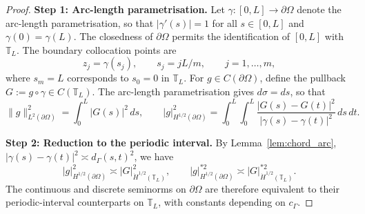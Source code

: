 \documentclass[11pt]{article}
\begin{document}
\begin{proof}
\textbf{Step 1: Arc-length parametrisation.}
Let $\gamma\colon[0,L] \to \partial\Omega$ denote the arc-length
parametrisation, so that $|\gamma'(s)| = 1$ for all $s \in [0,L]$
and $\gamma(0) = \gamma(L)$. The closedness of $\partial\Omega$
permits the identification of $[0,L]$ with $\mathbb{T}_L$. The
boundary collocation points are
\begin{equation*}
  z_j = \gamma(s_j),\qquad s_j = jL/m,\qquad j = 1,\ldots,m,
\end{equation*}
where $s_m = L$ corresponds to $s_0 = 0$ in $\mathbb{T}_L$. For
$g \in C(\partial\Omega)$, define the pullback
$G := g \circ \gamma \in C(\mathbb{T}_L)$. The arc-length
parametrisation gives $d\sigma = ds$, so that
\begin{equation*}
  \|g\|^2_{L^2(\partial\Omega)} = \int_0^L |G(s)|^2\,ds,
  \qquad
  |g|^2_{H^{1/2}(\partial\Omega)}
  = \int_0^L\!\int_0^L
    \frac{|G(s)-G(t)|^2}{|\gamma(s)-\gamma(t)|^2}\,ds\,dt.
\end{equation*}

\medskip\noindent
\textbf{Step 2: Reduction to the periodic interval.}
By Lemma~\ref{lem:chord_arc},
$|\gamma(s) - \gamma(t)|^2 \asymp d_\Gamma(s,t)^2$, we have
\begin{equation}\label{eq:transfer}
  |g|^2_{H^{1/2}(\partial\Omega)}
    \asymp |G|^2_{\dot{H}^{1/2}(\mathbb{T}_L)},
  \qquad
  |g|^{*2}_{H^{1/2}(\partial\Omega)}
    \asymp |G|^{*2}_{\dot{H}^{1/2}(\mathbb{T}_L)}.
\end{equation}
The continuous and discrete seminorms on $\partial\Omega$ are
therefore equivalent to their periodic-interval counterparts on
$\mathbb{T}_L$, with constants depending on $c_\Gamma$.


\end{proof}
\end{document}
